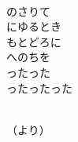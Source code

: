 \documentclass[10pt,b5j]{tarticle} %
\begin{document}
\begin{enumerate}
\begin{minipage}[c]{\blocksize}
    \end{minipage}
    \begin{minipage}[c]{\blocksize}
        
        \vspace{\linespace}
        \item~\\
        のさりて\\
        にゆるとき\\
        もとどろに\\
        へのちを\\
        ったった\\
        ったったった
        
        
    \end{minipage}
    \begin{minipage}[c]{\blocksize}
        
        \vspace{\linespace}
        \item~\\
        （より）
    
    \end{minipage}
\end{enumerate} %
\end{document}
